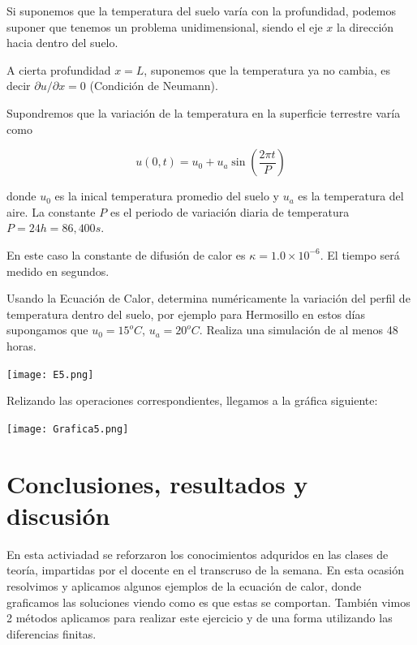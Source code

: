 \documentclass[12pt]{article}
\begin{document}
Si suponemos que la temperatura del suelo varía con la profundidad, podemos suponer que tenemos un problema unidimensional, siendo el eje $x$ la dirección hacia dentro del suelo.

A cierta profundidad $x=L$, suponemos que la temperatura ya no cambia, es decir $\partial u/\partial x = 0$ (Condición de Neumann).

Supondremos que la variación de la temperatura en la superficie terrestre varía como 

\begin{equation*}
u(0,t) = u_0 + u_a \sin (\frac{2\pi t}{P})
\end{equation*}

donde $u_0$ es la inical temperatura promedio del suelo y $u_a$ es la temperatura del aire. La constante $P$ es el periodo de variación diaria de temperatura $P=24 h=86,400 s$.

En este caso la constante de difusión de calor es $\kappa = 1.0 \times 10^{-6}$. El tiempo será medido en segundos. 

Usando la Ecuación de Calor, determina numéricamente  la variación del perfil de temperatura dentro del suelo, por ejemplo para Hermosillo en estos días supongamos que $u_0=15^{o}C$, $u_a= 20^{o}C$. Realiza una simulación de al menos 48 horas. 

\begin{center}
    \texttt{[image: E5.png]}
\end{center}

Relizando las operaciones correspondientes, llegamos a la gráfica siguiente:

\begin{center}
    \texttt{[image: Grafica5.png]}
\end{center}


\newpage

\section*{Conclusiones, resultados y discusión}
En esta activiadad se reforzaron los conocimientos adquridos en las clases de teoría, impartidas por el docente en el transcruso de la semana. En esta ocasión resolvimos y aplicamos algunos ejemplos de la ecuación de calor, donde graficamos las soluciones viendo como es que estas se comportan. También vimos 2 métodos aplicamos para realizar este ejercicio y de una forma utilizando las diferencias finitas.
\end{document}
